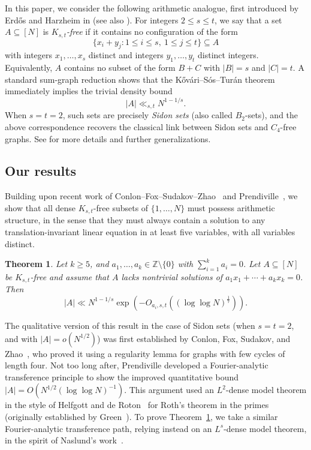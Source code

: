 \documentclass[A4paper,reqno,oneside,12pt]{amsart}
\theoremstyle{plain}
\newtheorem{theorem}{Theorem}[section]
\theoremstyle{definition}
\begin{document}
In this paper, we consider the following arithmetic analogue, first introduced by Erd\H{o}s and Harzheim in \cite{ErdosHarzheim1986} (see also \cite{CT18}). For integers $2\le s\le t$, we say that a set $A\subseteq [N]$ is \emph{$K_{s,t}$-free} if it contains no configuration of the form
\[
\{x_i+y_j : 1\le i\le s,\ 1\le j\le t\} \subseteq A
\]
with integers $x_1,\dots,x_s$ distinct and integers $y_1,\dots,y_t$ distinct integers. Equivalently, $A$ contains no subset of
the form $B+C$ with $|B|=s$ and $|C|=t$. A standard sum-graph reduction shows that the K\H{o}v\'ari--S\'os--Tur\'an theorem immediately implies
the trivial density bound
\[
|A| \ll_{s,t} N^{1-1/s}.
\]
When $s=t=2$, such sets are precisely \emph{Sidon sets} (also called $B_2$-sets), and the above
correspondence recovers the classical link between Sidon sets and $C_4$-free graphs. See \cite{CT18} for more details and further generalizations.

\medskip
\subsection*{Our results}
Building upon recent work of Conlon--Fox--Sudakov--Zhao~\cite{CFSZ} and Prendiville~\cite{Prendi}, we show that all dense $K_{s,t}$-free subsets of $\{1,\dots,N\}$ must possess arithmetic structure, in the sense that they must always contain a solution to any translation-invariant linear equation
in at least five variables, with all variables distinct.

\begin{theorem}\label{JPX} 
Let $k\geq 5$, and $a_1,\dots,a_k\in\mathbb{Z}\setminus\{0\}$ with $\sum_{i=1}^k a_i=0$. 
Let $A\subseteq [N]$ be $K_{s,t}$-free and assume that $A$ lacks nontrivial solutions of $a_1x_1+\cdots +a_kx_k=0$. Then
\[
|A|\ll N^{1-1/s} \exp(-O_{a_i,s,t}((\log\log N)^{\frac17})).
\]
\end{theorem}

The qualitative version of this result in the case of Sidon sets (when $s=t=2$, and with $|A| = o(N^{1/2})$) was first established by Conlon, Fox, Sudakov, and Zhao~\cite{CFSZ}, who proved it using a regularity lemma for graphs with few cycles of length four. Not too long after, Prendiville developed a Fourier-analytic transference principle to show the improved quantitative bound $|A| = O\!\left(N^{1/2}(\log\log N)^{-1}\right)$. This argument used an $L^{2}$-dense model theorem in the style of Helfgott and de Roton~\cite{HeRo} for Roth's theorem in the primes (originally established by Green~\cite{Gre05}). To prove Theorem~\ref{JPX}, we take a similar Fourier-analytic transference path, relying instead on an $L^{s}$-dense model theorem, in the spirit of Naslund's work~\cite{Naslund}.  
\end{document}
